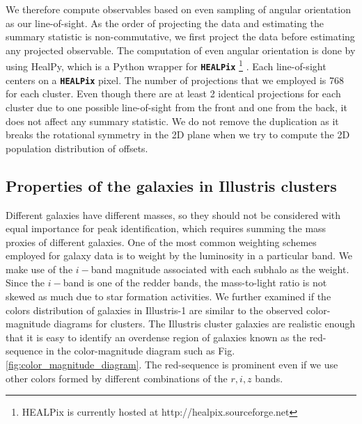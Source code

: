 We therefore compute observables based on even sampling of angular orientation 
as our line-of-sight.
As the order of projecting the data and estimating the summary statistic is
non-commutative, we first project the data before estimating any projected 
observable. 
The computation of even angular orientation 
is done by using HealPy, which is a Python wrapper for
{\bf \texttt{HEALPix}} \footnote{HEALPix is
currently hosted at http://healpix.sourceforge.net}
\citep{Gorski2005}. Each line-of-sight centers on a {\bf \texttt{HEALPix}} 
pixel.
The number of projections that we employed is 768 for each cluster.
Even though there are at least 2 identical projections for each cluster due to
one possible line-of-sight from the front and one from the back, it does not
affect any summary statistic. We do not remove the duplication as it breaks
the rotational symmetry in the 2D plane when we try to compute the 2D population
distribution of offsets.  


\subsection{Properties of the galaxies in Illustris clusters}
\label{subsec:galaxy_properties}

Different galaxies have different masses, so they should not be considered with equal
importance for peak identification, which requires summing
the mass proxies of different galaxies. One of the most common weighting schemes employed for galaxy data is to weight
by the luminosity in a particular band. We make use of the $i-$band magnitude
associated with each subhalo as the weight. Since the $i-$band is
one of the redder bands, the mass-to-light ratio is not skewed as much due to star
formation activities. 
We further examined if the colors distribution of galaxies in Illustris-1 are
similar to the observed color-magnitude diagrams for clusters.
The Illustris cluster galaxies are realistic enough that it is easy to
identify an overdense region of galaxies known as the red-sequence in the 
color-magnitude diagram such as Fig.
\ref{fig:color_magnitude_diagram}. The red-sequence is prominent even if we
use other colors formed by different combinations of the $r, i, z$ bands.

